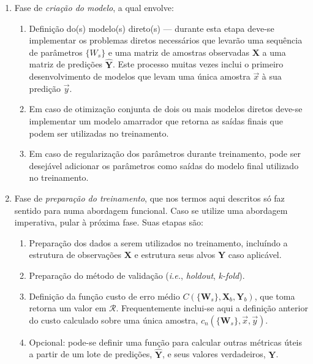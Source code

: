     \begin{enumerate}
      \item Fase de \emph{criação do modelo}, a qual envolve:
        \begin{enumerate}
          \item Definição do(s) modelo(s) direto(s) --- durante esta etapa deve-se implementar os problemas diretos necessários que levarão uma sequência de parâmetros $\{W_s\}$ e uma matriz de amostras observadas $\boldsymbol{X}$ a uma matriz de predições $\boldsymbol{\hat{Y}}$. Este processo muitas vezes inclui o primeiro desenvolvimento de modelos que levam uma única amostra $\vec{x}$ à sua predição $\vec{y}$.
          \item Em caso de otimização conjunta de dois ou mais modelos diretos deve-se implementar um modelo amarrador que retorna as saídas finais que podem ser utilizadas no treinamento.
          \item Em caso de regularização dos parâmetros durante treinamento, pode ser desejável adicionar os parâmetros como saídas do modelo final utilizado no treinamento.
        \end{enumerate}
      \item Fase de \emph{preparação do treinamento}, que nos termos aqui descritos só faz sentido para numa abordagem funcional. Caso se utilize uma abordagem imperativa, pular à próxima fase. Suas etapas são:
        \begin{enumerate}
          \item Preparação dos dados a serem utilizados no treinamento, incluíndo a estrutura de observações $\boldsymbol{X}$ e estrutura \DIFdelbegin {}\DIFdelend \DIFaddbegin {}\DIFaddend seus alvos $\boldsymbol{Y}$ caso aplicável.
          \item Preparação do método de validação (\textit{i.e.}, \textit{holdout}, \textit{k-fold}).
          \item Definição da função custo de erro médio $C(\{\boldsymbol{W}_s\}, \boldsymbol{X}_b, \boldsymbol{Y}_b)$\DIFdelbegin {}\DIFdelend , que toma \DIFdelbegin {}\DIFdelend \DIFaddbegin {}\DIFaddend retorna um valor em $\mathcal{R}$. Frequentemente inclui-se aqui a definição anterior do custo calculado sobre uma única amostra, $c_n(\{\boldsymbol{W}_s\}, \vec{x}, \vec{y})$.
          \item Opcional: pode-se definir uma função para calcular outras métricas úteis \DIFaddbegin \DIFadd{(}\textit{}\DIFaddend a partir de um lote de predições, $\boldsymbol{\hat{Y}}$, e seus valores verdadeiros, $\boldsymbol{Y}$.

\end{enumerate}
\end{enumerate}
